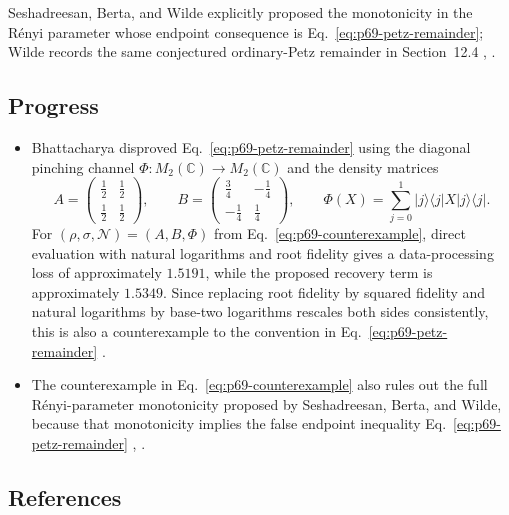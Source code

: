 Seshadreesan, Berta, and Wilde explicitly proposed the monotonicity in the
R\'enyi parameter whose endpoint consequence is
Eq.~\eqref{eq:p69-petz-remainder}; Wilde records the same conjectured
ordinary-Petz remainder in Section~12.4
,
.

\subsection*{Progress}

\begin{itemize}
  \item Bhattacharya disproved Eq.~\eqref{eq:p69-petz-remainder} using the
  diagonal pinching channel $\Phi:M_2(\mathbb C)\to M_2(\mathbb C)$ and the
  density matrices
  \begin{equation}
    A=\begin{pmatrix}
      \tfrac12&\tfrac12\\
      \tfrac12&\tfrac12
    \end{pmatrix},
    \qquad
    B=\begin{pmatrix}
      \tfrac34&-\tfrac14\\
      -\tfrac14&\tfrac14
    \end{pmatrix},
    \qquad
    \Phi(X)=\sum_{j=0}^{1}|j\rangle\!\langle j|X|j\rangle\!\langle j|.
    \label{eq:p69-counterexample}
  \end{equation}
  For $(\rho,\sigma,\mathcal N)=(A,B,\Phi)$ from
  Eq.~\eqref{eq:p69-counterexample}, direct evaluation with
  natural logarithms and root fidelity gives a data-processing loss of
  approximately $1.5191$, while the proposed recovery term is approximately
  $1.5349$.  Since replacing root fidelity by squared fidelity and natural
  logarithms by base-two logarithms rescales both sides consistently, this is
  also a counterexample to the convention in
  Eq.~\eqref{eq:p69-petz-remainder}
  .

  \item The counterexample in Eq.~\eqref{eq:p69-counterexample} also rules out
  the full R\'enyi-parameter monotonicity proposed by Seshadreesan, Berta, and
  Wilde, because that monotonicity implies the false endpoint inequality
  Eq.~\eqref{eq:p69-petz-remainder}
  ,
  .
\end{itemize}

\subsection*{References}

